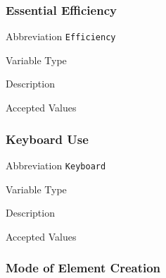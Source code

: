 \subsubsection{Essential Efficiency}
\label{subsec:efficiency}

\begin{AlignedDesc}
  \item[Abbreviation] \texttt{Efficiency}

  \item[Variable Type]

  \item[Description]

  \item[Accepted Values]

  \begin{AlignedDesc}
    \item[\textellipsis]
  \end{AlignedDesc}

\end{AlignedDesc}

\subsubsection{Keyboard Use}
\label{subsec:keyboard}

\begin{AlignedDesc}
  \item[Abbreviation] \texttt{Keyboard}

  \item[Variable Type]

  \item[Description]

  \item[Accepted Values]

  \begin{AlignedDesc}
    \item[\textellipsis]
  \end{AlignedDesc}

\end{AlignedDesc}

\subsubsection{Mode of Element Creation}
\label{subsec:mode}

